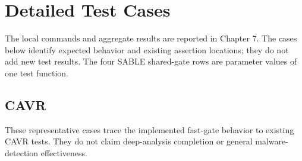 \chapter{Detailed Test Cases}
The local commands and aggregate results are reported in Chapter 7. The cases below identify expected behavior and existing assertion locations; they do not add new test results. The four SABLE shared-gate rows are parameter values of one test function.

\section*{CAVR}
These representative cases trace the implemented fast-gate behavior to existing CAVR tests. They do not claim deep-analysis completion or general malware-detection effectiveness.

